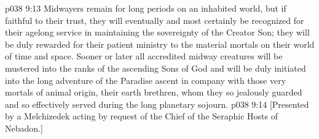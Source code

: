 \pc \vs p038 9:13 Midwayers remain for long periods on an inhabited world, but if faithful to their trust, they will eventually and most certainly be recognized for their agelong service in maintaining the sovereignty of the Creator Son; they will be duly rewarded for their patient ministry to the material mortals on their world of time and space. Sooner or later all accredited midway creatures will be mustered into the ranks of the ascending Sons of God and will be duly initiated into the long adventure of the Paradise ascent in company with those very mortals of animal origin, their earth brethren, whom they so jealously guarded and so effectively served during the long planetary sojourn.\plusone
\vsetoff
\vs p038 9:14 [Presented by a Melchizedek acting by request of the Chief of the Seraphic Hosts of Nebadon.]
